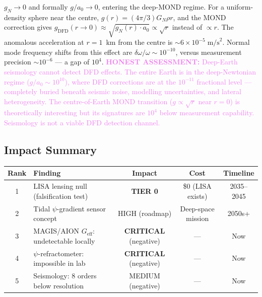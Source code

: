 \documentclass[11pt]{article}
\theoremstyle{definition}
\theoremstyle{remark}
\newcommand{\ee}[1]{\times10^{#1}}
\newcommand{\Geff}{G_{\mathrm{eff}}}
\newcommand{\honest}[1]{\textcolor{violet}{\textbf{HONEST ASSESSMENT:} #1}}
\begin{document}
\begin{tcolorbox}[colback=blue!5!white, colframe=blue!60!black,
  title=\textbf{TOP 5 FINDINGS --- W4i16 P6 (Ranked by Impact)}]
\begin{enumerate}[nosep]
  $g_N \to 0$ and formally $g/a_0 \to 0$,
  entering the deep-MOND regime.  For a uniform-density
  sphere near the centre, $g(r) = (4\pi/3)G_N \rho r$, and the
  MOND correction gives $g_{\mathrm{DFD}}(r \to 0) \approx
  \sqrt{g_N(r) \cdot a_0} \propto \sqrt{r}$ instead of $\propto r$.
  The anomalous acceleration at $r = 1$~km from the centre is
  $\sim 6\ee{-5}\;\mathrm{m/s}^2$.  Normal mode frequency shifts
  from this effect are $\delta\omega/\omega \sim 10^{-10}$, versus
  measurement precision $\sim 10^{-6}$ --- a gap of $10^4$.
  \honest{Deep-Earth seismology cannot detect DFD effects.
  The entire Earth is in the deep-Newtonian regime
  ($g/a_0 \sim 10^{10}$), where DFD corrections are at the
  $10^{-11}$ fractional level --- completely buried beneath
  seismic noise, modelling uncertainties, and lateral
  heterogeneity.  The centre-of-Earth MOND transition
  ($g \propto \sqrt{r}$ near $r = 0$) is theoretically
  interesting but its signatures are $10^4$ below measurement
  capability.  Seismology is not a viable DFD detection channel.}

\end{enumerate}
\end{tcolorbox}

\subsection*{Impact Summary}

\begin{table}[H]
\centering
\small
\begin{tabular}{@{}clccc@{}}
\toprule
Rank & Finding & Impact & Cost & Timeline \\
\midrule
1 & LISA lensing null (falsification test) & \textbf{TIER 0} & \$0 (LISA exists) & 2035--2045 \\
2 & Tidal $\psi$-gradient sensor concept & HIGH (roadmap) & Deep-space mission & 2050s+ \\
3 & MAGIS/AION $\Geff$: undetectable locally & \textbf{CRITICAL} (negative) & --- & Now \\
4 & $\psi$-refractometer: impossible in lab & \textbf{CRITICAL} (negative) & --- & Now \\
5 & Seismology: 8 orders below resolution & MEDIUM (negative) & --- & Now \\
\bottomrule
\end{tabular}
\end{table}

\end{document}
